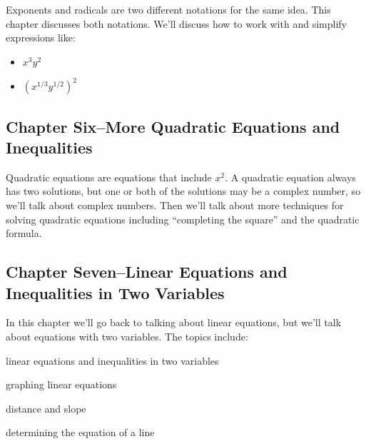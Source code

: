 \documentclass{article}
\begin{document}
Exponents and radicals are two different notations for the same idea.  This chapter discusses both notations.  We'll
discuss how to work with and simplify expressions like:

\begin{itemize}
  \item \( x^3y^2 \)
  \item \(  \left( x^{1/3} y^{1/2} \right)^2 \)
\end{itemize}

\subsection{Chapter Six--More Quadratic Equations and Inequalities}

Quadratic equations are equations that include \( x^2 \).  A quadratic equation always has two solutions, but one or
both of the solutions may be a complex number, so we'll talk about complex numbers.  Then we'll talk about more
techniques for solving quadratic equations including ``completing the square'' and the quadratic formula.

\subsection{Chapter Seven--Linear Equations and Inequalities in Two Variables}

In this chapter we'll go back to talking about linear equations, but we'll talk about equations with two variables.  The
topics include:

\begin{itemize*}
  \item linear equations and inequalities in two variables
  \item graphing linear equations
  \item distance and slope
  \item determining the equation of a line
\end{itemize*}
\end{document}
